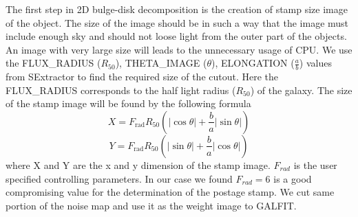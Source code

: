 \documentclass[a4paper,10pt]{article}
\begin{document}
The first step in 2D bulge-disk decomposition is the creation of stamp size image of the object. 
The size of the image should be in such a way that the image must include enough sky and should not loose light from the outer part of the objects.
An image with very large size will leads to the unnecessary usage of CPU.
We use the FLUX\_RADIUS ($R_{50}$), THETA\_IMAGE ($\theta$), ELONGATION ($\frac{a}{b}$) values from SExtractor to find the required size of the cutout.
Here the FLUX\_RADIUS corresponds to the half light radius ($R_{50}$) of the galaxy.
The size of the stamp image will be found by the following formula
\begin{equation}
X = F_{\textrm{rad}} R_{50} \left(|\cos\theta| + \frac{b}{a} | \sin\theta |\right)
\end{equation}
\begin{equation}
Y = F_{\textrm{rad}} R_{50} \left(| \sin\theta | + \frac{b}{a} | \cos\theta |\right)
\end{equation}
where X and Y are the x and y dimension of the stamp image. 
$F_{rad}$ is the user specified controlling parameters.
In our case we found $F_{rad} = 6$ is a good compromising value for the determination of the postage stamp.
We cut same portion of the noise map and use it as the weight image to GALFIT.
\end{document}

